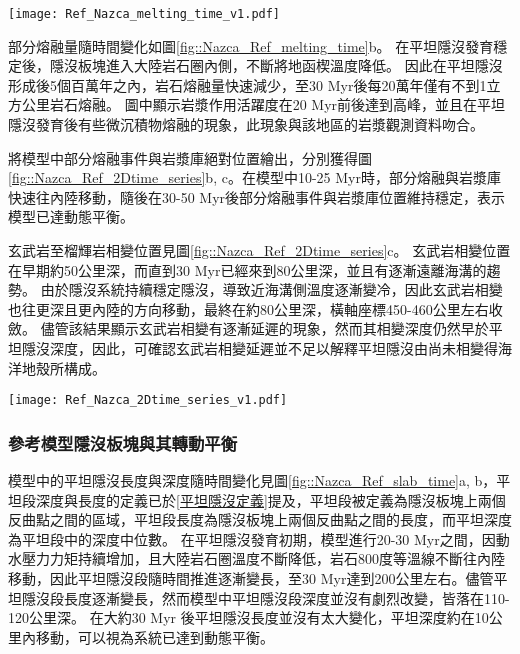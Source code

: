 \begin{figure*}[hb]
    \centering
    \texttt{[image: Ref\_Nazca\_melting\_time\_v1.pdf]}
    \caption[納茲卡參考模型岩漿作用隨時間變化]{納茲卡參考模型岩漿作用隨時間變化，灰色底標出平坦隱沒發育後時間段。(a)部分熔融與海溝之距離隨時間變化圖，縱軸中每個點代表每次部分熔融發生位置，顏色為部分指數上的熔融比例。(b)部分熔融量隨時間變化圖，部分熔融量單位為每單位海溝產生之立方公里量中每20萬年瞬時量。顏色代表不同岩相。}
    \label{fig::Nazca_Ref_melting_time}
\end{figure*}

部分熔融量隨時間變化如圖\ref{fig::Nazca_Ref_melting_time}b。
在平坦隱沒發育穩定後，隱沒板塊進入大陸岩石圈內側，不斷將地函楔溫度降低。
因此在平坦隱沒形成後5個百萬年之內，岩石熔融量快速減少，至30 Myr後每20萬年僅有不到1立方公里岩石熔融。
圖中顯示岩漿作用活躍度在20 Myr前後達到高峰，並且在平坦隱沒發育後有些微沉積物熔融的現象，此現象與該地區的岩漿觀測資料吻合。

將模型中部分熔融事件與岩漿庫絕對位置繪出，分別獲得圖\ref{fig::Nazca_Ref_2Dtime_series}b, c。在模型中10-25 Myr時，部分熔融與岩漿庫快速往內陸移動，隨後在30-50 Myr後部分熔融事件與岩漿庫位置維持穩定，表示模型已達動態平衡。

玄武岩至榴輝岩相變位置見圖\ref{fig::Nazca_Ref_2Dtime_series}c。
玄武岩相變位置在早期約50公里深，而直到30 Myr已經來到80公里深，並且有逐漸遠離海溝的趨勢。
由於隱沒系統持續穩定隱沒，導致近海溝側溫度逐漸變冷，因此玄武岩相變也往更深且更內陸的方向移動，最終在約80公里深，橫軸座標450-460公里左右收斂。
儘管該結果顯示玄武岩相變有逐漸延遲的現象，然而其相變深度仍然早於平坦隱沒深度，因此，可確認玄武岩相變延遲並不足以解釋平坦隱沒由尚未相變得海洋地殼所構成。
\begin{figure*}[h]
    \centering
    \texttt{[image: Ref\_Nazca\_2Dtime\_series\_v1.pdf]}
    \caption[納茲卡參考模型部分熔融、岩漿庫與玄武岩相變時空關係圖]{納茲卡參考模型部分熔融、岩漿庫與玄武岩相變時空關係圖。}
    \label{fig::Nazca_Ref_2Dtime_series}
\end{figure*}

\newpage
\subsubsection{參考模型隱沒板塊與其轉動平衡}
模型中的平坦隱沒長度與深度隨時間變化見圖\ref{fig::Nazca_Ref_slab_time}a, b，平坦段深度與長度的定義已於\ref{平坦隱沒定義}提及，平坦段被定義為隱沒板塊上兩個反曲點之間的區域，平坦段長度為隱沒板塊上兩個反曲點之間的長度，而平坦深度為平坦段中的深度中位數。
在平坦隱沒發育初期，模型進行20-30 Myr之間，因動水壓力力矩持續增加，且大陸岩石圈溫度不斷降低，岩石800度等溫線不斷往內陸移動，因此平坦隱沒段隨時間推進逐漸變長，至30 Myr達到200公里左右。儘管平坦隱沒段長度逐漸變長，然而模型中平坦隱沒段深度並沒有劇烈改變，皆落在110-120公里深。
在大約30 Myr 後平坦隱沒長度並沒有太大變化，平坦深度約在10公里內移動，可以視為系統已達到動態平衡。

